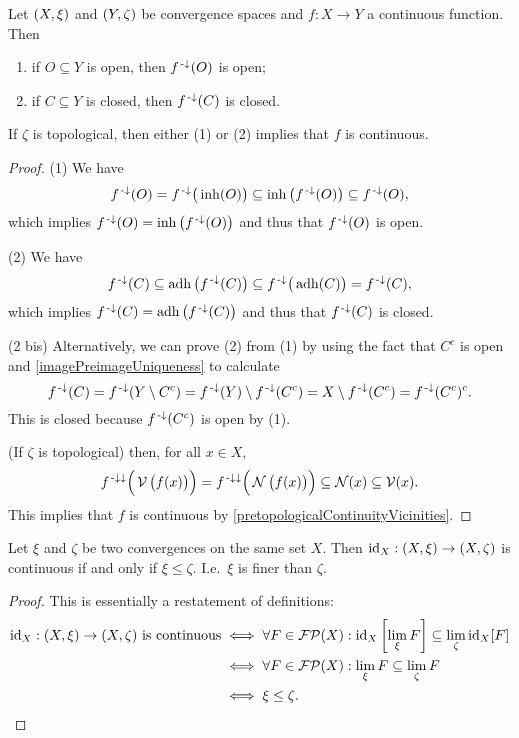 \begin{corollary} \label{preimageOpenClosed}
Let $\sSet{X,\xi}$ and $\sSet{Y,\zeta}$ be convergence spaces and $f: X\to Y$ a continuous function. Then
\begin{enumerate}
\item if $O\subseteq Y$ is open, then $f^{\text{\hspace{0.15em}-}\downarrow}(O)$ is open;
\item if $C\subseteq Y$ is closed, then $f^{\text{\hspace{0.15em}-}\downarrow}(C)$ is closed.
\end{enumerate}
If $\zeta$ is topological, then either (1) or (2) implies that $f$ is continuous.
\end{corollary}
\begin{proof}
(1) We have
\[ f^{\text{\hspace{0.15em}-}\downarrow}(O) = f^{\text{\hspace{0.15em}-}\downarrow}\big(\operatorname{inh}(O)\big) \subseteq \operatorname{inh}\big(f^{\text{\hspace{0.15em}-}\downarrow}(O)\big) \subseteq f^{\text{\hspace{0.15em}-}\downarrow}(O), \]
which implies $f^{\text{\hspace{0.15em}-}\downarrow}(O) = \operatorname{inh}\big(f^{\text{\hspace{0.15em}-}\downarrow}(O)\big)$ and thus that $f^{\text{\hspace{0.15em}-}\downarrow}(O)$ is open.

(2) We have
\[ f^{\text{\hspace{0.15em}-}\downarrow}(C) \subseteq \operatorname{adh}\big(f^{\text{\hspace{0.15em}-}\downarrow}(C)\big) \subseteq f^{\text{\hspace{0.15em}-}\downarrow}\big(\operatorname{adh}(C)\big) = f^{\text{\hspace{0.15em}-}\downarrow}(C), \]
which implies $f^{\text{\hspace{0.15em}-}\downarrow}(C) = \operatorname{adh}\big(f^{\text{\hspace{0.15em}-}\downarrow}(C)\big)$ and thus that $f^{\text{\hspace{0.15em}-}\downarrow}(C)$ is closed.

(2 bis) Alternatively, we can prove (2) from (1) by using the fact that $C^c$ is open and \ref{imagePreimageUniqueness} to calculate
\[ f^{\text{\hspace{0.15em}-}\downarrow}(C) = f^{\text{\hspace{0.15em}-}\downarrow}(Y\setminus C^c) = f^{\text{\hspace{0.15em}-}\downarrow}(Y)\setminus f^{\text{\hspace{0.15em}-}\downarrow}(C^c) = X\setminus f^{\text{\hspace{0.15em}-}\downarrow}(C^c) = f^{\text{\hspace{0.15em}-}\downarrow}(C^c)^c. \]
This is closed because $f^{\text{\hspace{0.15em}-}\downarrow}(C^c)$ is open by (1).

(If $\zeta$ is topological) then, for all $x\in X$,
\[ f^{{\text{\hspace{0.15em}-}\downarrow}\downarrow}\Big(\operatorname{\mathcal{V}}\big(f(x)\big)\Big) = f^{{\text{\hspace{0.15em}-}\downarrow}\downarrow}\Big(\operatorname{\mathcal{N}}\big(f(x)\big)\Big) \subseteq \operatorname{\mathcal{N}}(x) \subseteq \operatorname{\mathcal{V}}(x). \]
This implies that $f$ is continuous by \ref{pretopologicalContinuityVicinities}.
\end{proof}


\begin{lemma} \label{identityContinuity}
Let $\xi$ and $\zeta$ be two convergences on the same set $X$. Then $\id_X: \sSet{X,\xi} \to \sSet{X,\zeta}$ is continuous \textup{if and only if} $\xi \leq \zeta$. I.e.\ $\xi$ is finer than $\zeta$.
\end{lemma}
\begin{proof}
This is essentially a restatement of definitions:
\begin{align*}
\text{$\id_X: \sSet{X,\xi} \to \sSet{X,\zeta}$ is continuous} &\iff \forall F\in\powerfilters(X): \id_X\left[\lim_\xi F \right] \subseteq \lim_\zeta \id_X[F] \\
&\iff \forall F\in\powerfilters(X): \lim_\xi F \subseteq \lim_\zeta F \\
&\iff \xi \leq \zeta.
\end{align*}
\end{proof}

